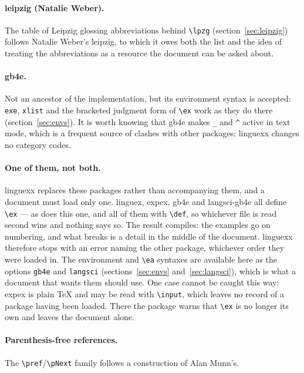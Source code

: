 \documentclass[11pt,a4paper]{article}
\newcommand{\cs}[1]{\texttt{\textbackslash #1}}
\newcommand{\pkg}[2][]{\textsf{#2}}
\newcommand{\opt}[1]{\texttt{#1}}
\begin{document}
\paragraph{\pkg{leipzig} (Natalie Weber).} The table of Leipzig glossing
abbreviations behind \cs{lpzg} (section~\ref{sec:leipzig}) follows Natalie
Weber's \pkg{leipzig}, to which it owes both the list and the idea of
treating the abbreviations as a resource the document can be asked about.

\paragraph{\pkg{gb4e}.} Not an ancestor of the implementation, but its
environment syntax is accepted: \texttt{exe}, \texttt{xlist} and the
bracketed judgment form of \cs{ex} work as they do there
(section~\ref{sec:envs}). It is worth knowing that \pkg{gb4e} makes
\texttt{\_} and \texttt{\^{}} active in text mode, which is a frequent
source of clashes with other packages; \pkg{linguexx} changes no
category codes.

\paragraph{One of them, not both.} \pkg{linguexx} replaces these packages
rather than accompanying them, and a document must load only one.
\pkg{linguex}, \pkg{expex}, \pkg{gb4e} and \pkg{langsci-gb4e} all define
\cs{ex} --- as does this one, and all of them with \cs{def}, so whichever
file is read second wins and nothing says so. The result compiles: the
examples go on numbering, and what breaks is a detail in the middle of the
document. \pkg{linguexx} therefore stops with an error naming the other
package, whichever order they were loaded in. The environment and
\cs{ea} syntaxes are available here as the options \opt{gb4e} and
\opt{langsci} (sections~\ref{sec:envs} and~\ref{sec:langsci}), which is
what a document that wants them should use. One case cannot be caught
this way: \pkg{expex} is plain \TeX{} and may be read with \cs{input},
which leaves no record of a package having been loaded. There the
package warns that \cs{ex} is no longer its own and leaves the document
alone.

\paragraph{Parenthesis-free references.} The \cs{pref}/\cs{pNext} family
follows a construction of Alan Munn's.
\end{document}
